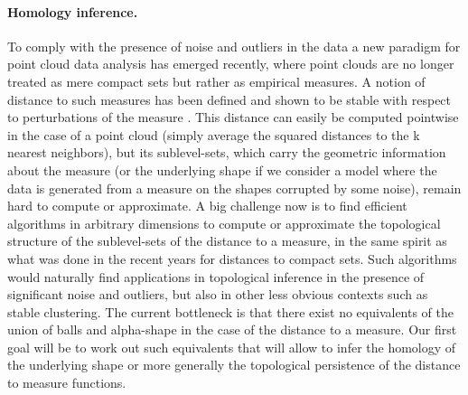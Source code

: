 \paragraph{Homology inference.}
To comply with the presence of noise and outliers in the data a new paradigm for point cloud data analysis has emerged recently, where point clouds are no
longer treated as mere compact sets but rather as empirical measures. A notion of distance to
such measures has been defined and shown to be stable with respect to perturbations of the
measure \cite{ccsm-gipm-2011}. This distance can easily be computed pointwise in the case of a point cloud (simply
average the squared distances to the k nearest neighbors), but its sublevel-sets, which carry the
geometric information about the measure (or the underlying shape if we consider a model where the data is generated from a measure on the shapes corrupted by some noise), remain hard to compute or approximate. A big challenge now is to find efficient algorithms in arbitrary dimensions to compute or approximate
the topological structure of the sublevel-sets of the distance to a measure, in the same spirit as
what was done in the recent years for distances to compact sets. Such algorithms would naturally
find applications in topological inference in the presence of significant noise and outliers, but
also in other less obvious contexts such as stable clustering. The current bottleneck is that
there exist no equivalents of the union of balls and alpha-shape in the case of the distance to
a measure. Our first goal will be to work out such equivalents that will allow to infer the homology of the underlying shape or more generally the topological persistence of the distance to measure functions.
